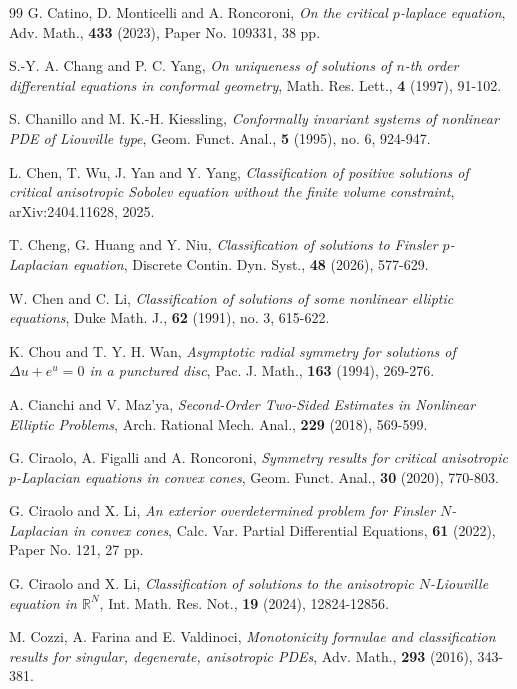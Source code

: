 \documentclass[12pt]{amsart}
\theoremstyle{definition}
\theoremstyle{remark}
\theoremstyle{conclusion}
\theoremstyle{conjecture}
\numberwithin{equation}{section}
\begin{document}
\begin{thebibliography}{99}
 G. Catino, D. Monticelli and A. Roncoroni, {\it On the critical $p$-laplace equation}, Adv. Math., \textbf{433} (2023), Paper No. 109331, 38 pp.

 S.-Y. A. Chang and P. C. Yang, {\it On uniqueness of solutions of $n$-th order differential equations in conformal geometry}, Math. Res. Lett., \textbf{4} (1997), 91-102.

 S. Chanillo and M. K.-H. Kiessling, {\it Conformally invariant systems of nonlinear PDE of Liouville type}, Geom. Funct. Anal., \textbf{5} (1995), no. 6, 924-947.

 L. Chen, T. Wu, J. Yan and Y. Yang, {\it Classification of positive solutions of critical anisotropic Sobolev equation without the finite volume constraint}, arXiv:2404.11628, 2025.

 T. Cheng, G. Huang and Y. Niu, {\it Classification of solutions to Finsler $p$-Laplacian equation}, Discrete Contin. Dyn. Syst., \textbf{48} (2026), 577-629.

 W. Chen and C. Li, {\it Classification of solutions of some nonlinear elliptic equations}, Duke Math. J., \textbf{62} (1991), no. 3, 615-622.

 K. Chou and T. Y. H. Wan, {\it Asymptotic radial symmetry for solutions of $\Delta u+e^{u}=0$ in a punctured disc}, Pac. J. Math., \textbf{163} (1994), 269-276.

 A. Cianchi and V. Maz'ya, {\it  Second-Order Two-Sided Estimates in Nonlinear Elliptic Problems}, Arch. Rational Mech. Anal., \textbf{229} (2018), 569-599.

 G. Ciraolo, A. Figalli and A. Roncoroni, {\it Symmetry results for critical anisotropic $p$-Laplacian equations in convex cones}, Geom. Funct. Anal., \textbf{30} (2020), 770-803.

 G. Ciraolo and X. Li, {\it An exterior overdetermined problem for Finsler $N$-Laplacian in convex cones}, Calc. Var. Partial Differential Equations, \textbf{61} (2022), Paper No. 121, 27 pp.

 G. Ciraolo and X. Li, {\it Classification of solutions to the anisotropic $N$-Liouville equation in $\mathbb{R}^N$}, Int. Math. Res. Not., \textbf{19} (2024), 12824-12856.

 M. Cozzi, A. Farina and E. Valdinoci, {\it Monotonicity formulae and classification results for singular, degenerate, anisotropic PDEs}, Adv. Math., \textbf{293} (2016), 343-381.


\end{thebibliography}
\end{document}

